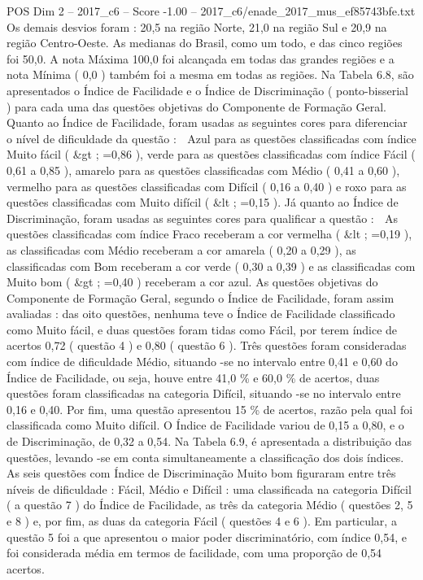 \begin{textsample}{POS Dim 2 – 2017\_c6 – Score -1.00 – 2017\_c6/enade\_2017\_mus\_ef85743bfe.txt}
Os demais desvios foram : 20,5 na região Norte, 21,0 na região Sul e 20,9 na região Centro-Oeste.
As medianas do Brasil, como um todo, e das cinco regiões foi 50,0.
A nota Máxima 100,0 foi alcançada em todas das grandes regiões e a nota Mínima ( 0,0 ) também foi a mesma em todas as regiões.
Na Tabela 6.8, são apresentados o Índice de Facilidade e o Índice de Discriminação ( ponto-bisserial ) para cada uma das questões objetivas do Componente de Formação Geral.
Quanto ao Índice de Facilidade, foram usadas as seguintes cores para diferenciar o nível de dificuldade da questão :  Azul para as questões classificadas com índice Muito fácil ( \&gt ; =0,86 ), verde para as questões classificadas com índice Fácil ( 0,61 a 0,85 ), amarelo para as questões classificadas com Médio ( 0,41 a 0,60 ), vermelho para as questões classificadas com Difícil ( 0,16 a 0,40 ) e roxo para as questões classificadas com Muito difícil ( \&lt ; =0,15 ).
Já quanto ao Índice de Discriminação, foram usadas as seguintes cores para qualificar a questão :  As questões classificadas com índice Fraco receberam a cor vermelha ( \&lt ; =0,19 ), as classificadas com Médio receberam a cor amarela ( 0,20 a 0,29 ), as classificadas com Bom receberam a cor verde ( 0,30 a 0,39 ) e as classificadas com Muito bom ( \&gt ; =0,40 ) receberam a cor azul.
As questões objetivas do Componente de Formação Geral, segundo o Índice de Facilidade, foram assim avaliadas : das oito questões, nenhuma teve o Índice de Facilidade classificado como Muito fácil, e duas questões foram tidas como Fácil, por terem índice de acertos 0,72 ( questão 4 ) e 0,80 ( questão 6 ).
Três questões foram consideradas com índice de dificuldade Médio, situando -se no intervalo entre 0,41 e 0,60 do Índice de Facilidade, ou seja, houve entre 41,0 \% e 60,0 \% de acertos, duas questões foram classificadas na categoria Difícil, situando -se no intervalo entre 0,16 e 0,40.
Por fim, uma questão apresentou 15 \% de acertos, razão pela qual foi classificada como Muito difícil.
O Índice de Facilidade variou de 0,15 a 0,80, e o de Discriminação, de 0,32 a 0,54.
Na Tabela 6.9, é apresentada a distribuição das questões, levando -se em conta simultaneamente a classificação dos dois índices.
As seis questões com Índice de Discriminação Muito bom figuraram entre três níveis de dificuldade : Fácil, Médio e Difícil : uma classificada na categoria Difícil ( a questão 7 ) do Índice de Facilidade, as três da categoria Médio ( questões 2, 5 e 8 ) e, por fim, as duas da categoria Fácil ( questões 4 e 6 ).
Em particular, a questão 5 foi a que apresentou o maior poder discriminatório, com índice 0,54, e foi considerada média em termos de facilidade, com uma proporção de 0,54 acertos.

\end{textsample}
